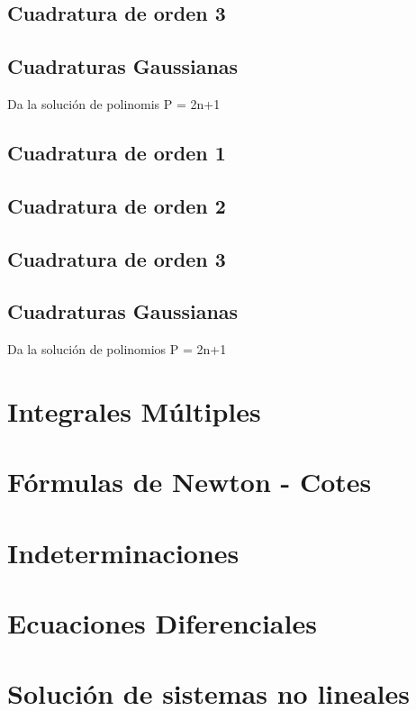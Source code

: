 \subsection{Cuadratura de orden 3}

\subsection{Cuadraturas Gaussianas}
Da la soluci\'on de polinomis P = 2n+1


\subsection{Cuadratura de orden 1}

\subsection{Cuadratura de orden 2}

\subsection{Cuadratura de orden 3}

\subsection{Cuadraturas Gaussianas}
Da la soluci\'on de polinomios P = 2n+1

\section{Integrales M\'ultiples}

\section{F\'ormulas de Newton - Cotes}

\section{Indeterminaciones}

\section{Ecuaciones Diferenciales}

\section{Soluci\'on de sistemas no lineales}

